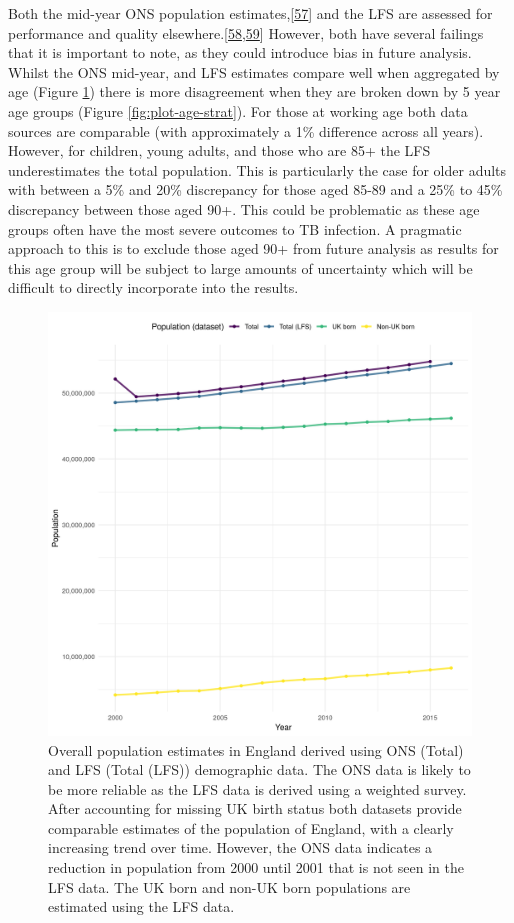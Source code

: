 \documentclass[11pt,twoside]{bristolthesis}
\begin{document}
  Both the mid-year ONS population estimates,{[}\protect\hyperlink{ref-storey2016}{57}{]} and the LFS are assessed for performance and quality elsewhere.{[}\protect\hyperlink{ref-NHSTraffordCCGGoverningBody2015}{58},\protect\hyperlink{ref-Date2012}{59}{]} However, both have several failings that it is important to note, as they could introduce bias in future analysis. Whilst the ONS mid-year, and LFS estimates compare well when aggregated by age (Figure \ref{fig:plot-overall-pop}) there is more disagreement when they are broken down by 5 year age groups (Figure \ref{fig:plot-age-strat}). For those at working age both data sources are comparable (with approximately a 1\% difference across all years). However, for children, young adults, and those who are 85+ the LFS underestimates the total population. This is particularly the case for older adults with between a 5\% and 20\% discrepancy for those aged 85-89 and a 25\% to 45\% discrepancy between those aged 90+. This could be problematic as these age groups often have the most severe outcomes to TB infection. A pragmatic approach to this is to exclude those aged 90+ from future analysis as results for this age group will be subject to large amounts of uncertainty which will be difficult to directly incorporate into the results.
  \begin{figure}
  
  {\centering \includegraphics[width=0.8\linewidth,]{chapters/tb-epi-england/figures/plot-overall-pop} 
  
  }
  
  \caption[Overall population estimates in England derived using ONS and LFS demographic data.]{Overall population estimates in England derived using ONS (Total) and LFS (Total (LFS)) demographic data. The ONS data is likely to be more reliable as the LFS data is derived using a weighted survey. After accounting for missing UK birth status both datasets provide comparable estimates of the population of England, with a clearly increasing trend over time. However, the ONS data indicates a reduction in population from 2000 until 2001 that is not seen in the LFS data. The UK born and non-UK born populations are estimated using the LFS data.}\label{fig:plot-overall-pop}
  \end{figure}
\end{document}
